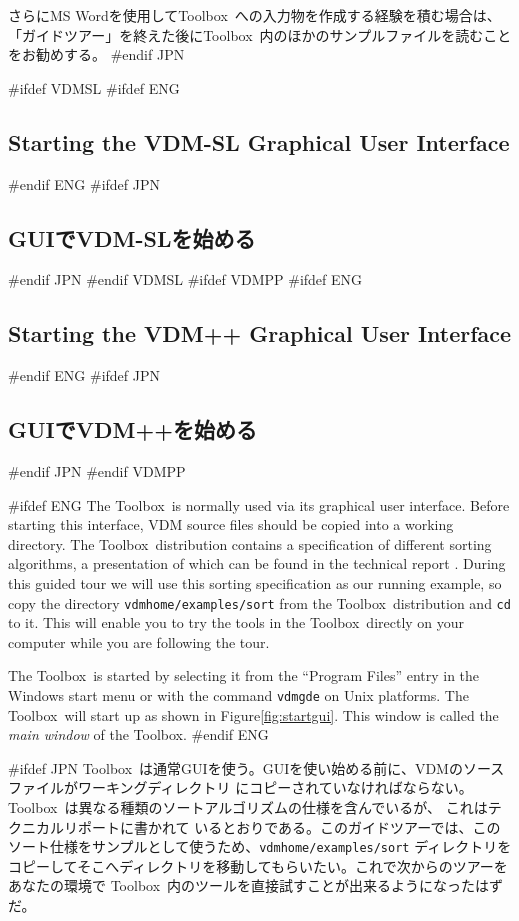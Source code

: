 \documentclass[\pformat,12pt]{article}
\newcommand{\Toolbox}{Toolbox}
\newcommand{\vdmgde}{vdmgde}
\newcommand{\vdmhome}{vdmhome}
\newcommand{\Toolbox}{Toolbox}
\newcommand{\vdmgde}{vppgde}
\newcommand{\vdmhome}{vpphome}
\begin{document}
さらにMS Wordを使用して\Toolbox\ への入力物を作成する経験を積む場合は、
「ガイドツアー」を終えた後に\Toolbox\ 内のほかのサンプルファイルを読むことをお勧めする。
#endif JPN


#ifdef VDMSL
#ifdef ENG
\subsection{Starting the VDM-SL Graphical User Interface} 
#endif ENG
#ifdef JPN
\subsection{GUIでVDM-SLを始める} 
#endif JPN
#endif VDMSL
#ifdef VDMPP
#ifdef ENG
\subsection{Starting the VDM++ Graphical User Interface} 
#endif ENG
#ifdef JPN
\subsection{GUIでVDM++を始める} 
#endif JPN
#endif VDMPP

#ifdef ENG
The \Toolbox\ is normally used via its graphical user interface. Before
starting this interface, VDM source files should be copied into a
working directory. The \Toolbox\ distribution contains a specification
of different sorting algorithms, a presentation of which can be found
in the technical report
.  During
this guided tour we will use this sorting specification as our running
example, so copy the directory {\tt \vdmhome/examples/sort} from the
\Toolbox\ distribution and {\tt cd} to it.  This will enable you to
try the tools in the \Toolbox\ directly on your computer while you are
following the tour.

The \Toolbox\ is started by selecting it from the ``Program Files''
entry in the Windows start menu or with the command {\tt \vdmgde}
 on Unix platforms. The \Toolbox\ 
will start up as shown in Figure\ref{fig:startgui}. This window is
called the {\em main window\/} of the \Toolbox.
#endif ENG

#ifdef JPN
\Toolbox\ は通常GUIを使う。GUIを使い始める前に、VDMのソースファイルがワーキングディレクトリ
にコピーされていなければならない。\Toolbox\ は異なる種類のソートアルゴリズムの仕様を含んでいるが、
これはテクニカルリポートに書かれて
いるとおりである。このガイドツアーでは、このソート仕様をサンプルとして使うため、{\tt \vdmhome/examples/sort}
ディレクトリをコピーしてそこへディレクトリを移動してもらいたい。これで次からのツアーをあなたの環境で
\Toolbox\ 内のツールを直接試すことが出来るようになったはずだ。
\end{document}
